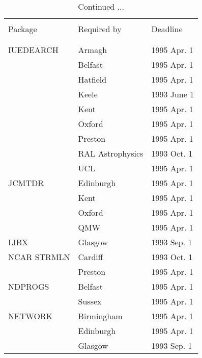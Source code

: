 \addtocounter{table}{-1}
\begin{table}
\caption{Continued ...}
\vspace{5mm}
\begin{center}
\begin{tabular}{|p{36mm}|p{50mm}|p{30mm}|} \hline
& & \\
Package & Required by & Deadline \\
& & \\ \hline
& & \\
IUEDEARCH               & Armagh           & 1995 Apr. 1 \\
                        & Belfast          & 1995 Apr. 1 \\
                        & Hatfield         & 1995 Apr. 1 \\
                        & Keele            & 1993 June 1 \\
                        & Kent             & 1995 Apr. 1 \\
                        & Oxford           & 1995 Apr. 1 \\
                        & Preston          & 1995 Apr. 1 \\
                        & RAL Astrophysics & 1993 Oct. 1 \\
                        & UCL              & 1995 Apr. 1 \\
JCMTDR                  & Edinburgh        & 1995 Apr. 1 \\
                        & Kent             & 1995 Apr. 1 \\
                        & Oxford           & 1995 Apr. 1 \\
                        & QMW              & 1995 Apr. 1 \\
LIBX                    & Glasgow          & 1993 Sep. 1 \\
NCAR STRMLN             & Cardiff          & 1993 Oct. 1 \\
                        & Preston          & 1995 Apr. 1 \\
NDPROGS                 & Belfast          & 1995 Apr. 1 \\
                        & Sussex           & 1995 Apr. 1 \\
NETWORK                 & Birmingham       & 1995 Apr. 1 \\
                        & Edinburgh        & 1995 Apr. 1 \\
                        & Glasgow          & 1993 Sep. 1 \\

\end{tabular}
\end{center}
\end{table}
